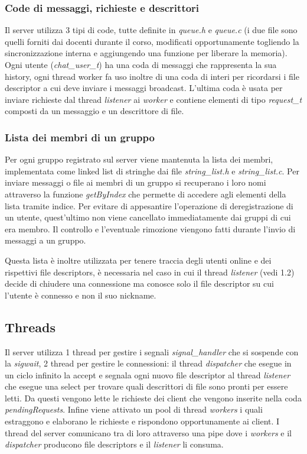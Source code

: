 \documentclass[11pt]{article}
\begin{document}
\subsubsection{Code di messaggi, richieste e descrittori}
Il server utilizza 3 tipi di code, tutte definite in \emph{queue.h} e \emph{queue.c} (i due file sono quelli forniti dai docenti durante il corso, modificati opportunamente togliendo la sincronizzazione interna e aggiungendo una funzione per liberare la memoria). Ogni utente (\emph{chat\_user\_t}) ha una coda di messaggi che rappresenta la sua history, ogni thread worker fa uso inoltre di una coda di interi per ricordarsi i file descriptor a cui deve inviare i messaggi broadcast. L'ultima coda è usata per inviare richieste dal thread \emph{listener} ai \emph{worker} e contiene elementi di tipo \emph{request\_t} composti da un messaggio e un descrittore di file.

\subsubsection{Lista dei membri di un gruppo}
Per ogni gruppo registrato sul server viene mantenuta la lista dei membri, implementata come linked list di stringhe dai file \emph{string\_list.h} e \emph{string\_list.c}. Per inviare messaggi o file ai membri di un gruppo si recuperano i loro nomi attraverso la funzione \emph{getByIndex} che permette di accedere agli elementi della lista tramite indice. Per evitare di appesantire l'operazione di deregistrazione di un utente, quest'ultimo non viene cancellato immediatamente dai gruppi di cui era membro. Il controllo e l'eventuale rimozione viengono fatti durante l'invio di messaggi a un gruppo.

Questa lista \`e inoltre utilizzata per tenere traccia degli utenti online e dei rispettivi file descriptors, \`e necessaria nel caso in cui il thread \emph{listener} (vedi 1.2) decide di chiudere una connessione ma conosce solo il file descriptor su cui l'utente \`e connesso e non il suo nickname.

\subsection{Threads}
Il server utilizza 1 thread per gestire i segnali \emph{signal\_handler} che si sospende con la \emph{sigwait}, 2 thread per gestire le connessioni: il thread \emph{dispatcher} che esegue in un ciclo infinito la accept e segnala ogni nuovo file descriptor al thread \emph{listener} che esegue una select per trovare quali descrittori di file sono pronti per essere letti. Da questi vengono lette le richieste dei client che vengono inserite nella coda \emph{pendingRequests}. Infine viene attivato un pool di thread \emph{workers} i quali estraggono e elaborano le richieste e rispondono opportunamente ai client. I thread del server comunicano tra di loro attraverso una pipe dove i \emph{workers} e il \emph{dispatcher} producono file descriptors e il \emph{listener} li consuma.
\end{document}
